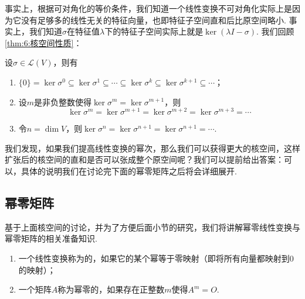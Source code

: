 事实上，根据可对角化的等价条件，我们知道一个线性变换不可对角化实际上是因为它没有足够多的线性无关的特征向量，也即特征子空间直和后比原空间略小. 事实上，我们知道$\sigma$在特征值$\lambda$下的特征子空间实际上就是$\ker(\lambda I-\sigma)$. 我们回顾\autoref{thm:6:核空间性质}：
\begin{theorem}\label{thm:20:核空间性质}
    设$\sigma\in \mathcal{L}(V)$，则有
    \begin{enumerate}
        \item $\{0\}=\ker \sigma^0\subseteq\ker \sigma^1\subseteq\cdots\subseteq\ker \sigma^k\subseteq\ker \sigma^{k+1}\subseteq\cdots$；

        \item 设$m$是非负整数使得$\ker \sigma^m=\ker \sigma^{m+1}$，则
              \[\ker \sigma^m=\ker \sigma^{m+1}=\ker \sigma^{m+2}=\ker \sigma^{m+3}=\cdots\]

        \item 令$n=\dim V$，则$\ker \sigma^n=\ker \sigma^{n+1}=\ker \sigma^{n+1}=\cdots$.
    \end{enumerate}
\end{theorem}

我们发现，如果我们提高线性变换的幂次，那么我们可以获得更大的核空间，这样扩张后的核空间的直和是否可以张成整个原空间呢？我们可以提前给出答案：可以，具体的说明我们在讨论完下面的幂零矩阵之后将会详细展开.

\subsection{幂零矩阵}

基于上面核空间的讨论，并为了方便后面小节的研究，我们将讲解幂零线性变换与幂零矩阵的相关准备知识.
\begin{definition}[幂零] 
    \begin{enumerate}
        \item 一个线性变换称为的，如果它的某个幂等于零映射（即将所有向量都映射到0的映射）；

        \item 一个矩阵$A$称为幂零的，如果存在正整数$m$使得$A^m=O$.
    \end{enumerate}
\end{definition}

